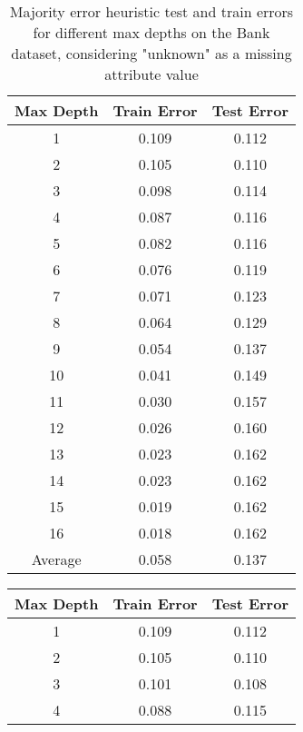 \documentclass[12pt, fullpage,letterpaper]{article}
\begin{document}
\begin{enumerate}
\begin{enumerate}
\newpage
\begin{table}[ht]
	\centering
	\begin{tabular}{|c|c|c|}
        \hline
		Max Depth & Train Error & Test Error\\ 
		\hline\hline
		1 & 0.109 & 0.112 \\ \hline
		2 & 0.105 & 0.110 \\ \hline
		3 & 0.098 & 0.114 \\ \hline
		4 & 0.087 & 0.116 \\ \hline
		5 & 0.082 & 0.116 \\ \hline
		6 & 0.076 & 0.119 \\ \hline
		7 & 0.071 & 0.123 \\ \hline
		8 & 0.064 & 0.129 \\ \hline
		9 & 0.054 & 0.137 \\ \hline
		10 & 0.041 & 0.149 \\ \hline
		11 & 0.030 & 0.157 \\ \hline
		12 & 0.026 & 0.160 \\ \hline
		13 & 0.023 & 0.162 \\ \hline
		14 & 0.023 & 0.162 \\ \hline
		15 & 0.019 & 0.162 \\ \hline
		16 & 0.018 & 0.162 \\ \hline
		Average & 0.058 & 0.137 \\ \hline
	\end{tabular}
	\caption{Majority error heuristic test and train errors for different max depths on the Bank dataset, considering "unknown" as a missing attribute value}
    \label{table:3bmajorityerror}
\end{table}

\newpage
\begin{table}[ht]
	\centering
	\begin{tabular}{|c|c|c|}
        \hline
		Max Depth & Train Error & Test Error\\ 
		\hline\hline
		1 & 0.109 & 0.112 \\ \hline
		2 & 0.105 & 0.110 \\ \hline
		3 & 0.101 & 0.108 \\ \hline
		4 & 0.088 & 0.115 \\ \hline


\end{tabular}
\end{table}
\end{enumerate}
\end{enumerate}
\end{document}
